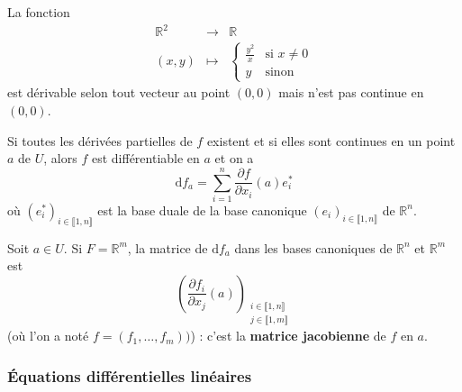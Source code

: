 	\begin{cexample}
		La fonction
		\[
			\begin{array}{ccc}
				\mathbb{R}^2 &\rightarrow& \mathbb{R} \\
				(x,y) &\mapsto& \begin{cases}
					\frac{y^2}{x} &\text{si } x \neq 0 \\
					y &\text{sinon}
				\end{cases}
			\end{array}
		\]
		est dérivable selon tout vecteur au point $(0,0)$ mais n'est pas continue en $(0,0)$.
	\end{cexample}

	\begin{theorem}
		Si toutes les dérivées partielles de $f$ existent et si elles sont continues en un point $a$ de $U$, alors $f$ est différentiable en $a$ et on a
		\[ \mathrm{d}f_a = \sum_{i=1}^n \frac{\partial f}{\partial x_i}(a) e_i^* \]
		où $(e_i^*)_{i \in \llbracket 1, n \rrbracket}$ est la base duale de la base canonique $(e_i)_{i \in \llbracket 1, n \rrbracket}$ de $\mathbb{R}^n$.
	\end{theorem}

	\begin{application}
		Soit $a \in U$. Si $F = \mathbb{R}^m$, la matrice de $\mathrm{d}f_a$ dans les bases canoniques de $\mathbb{R}^n$ et $\mathbb{R}^m$ est
		\[ \left(\frac{\partial f_i}{\partial x_j}(a)\right)_{\substack{i \in \llbracket 1, n \rrbracket \\ j \in \llbracket 1, m \rrbracket}} \]
		(où l'on a noté $f = (f_1, \dots, f_m))$) : c'est la \textbf{matrice jacobienne} de $f$ en $a$.
	\end{application}

	\subsubsection{Équations différentielles linéaires}


